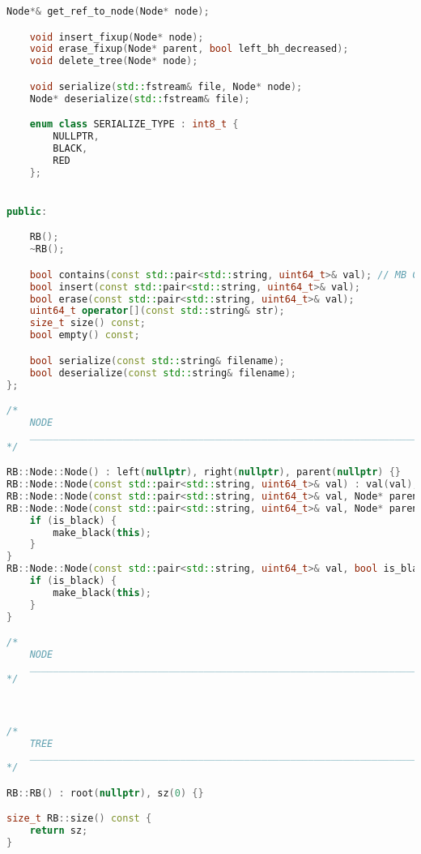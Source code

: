 \begin{lstlisting}[language=C++]
    Node*& get_ref_to_node(Node* node);

    void insert_fixup(Node* node);
    void erase_fixup(Node* parent, bool left_bh_decreased);
    void delete_tree(Node* node);

    void serialize(std::fstream& file, Node* node);
    Node* deserialize(std::fstream& file);

    enum class SERIALIZE_TYPE : int8_t {
        NULLPTR,
        BLACK,
        RED
    };


public:

    RB();
    ~RB();

    bool contains(const std::pair<std::string, uint64_t>& val); // MB CONST
    bool insert(const std::pair<std::string, uint64_t>& val);
    bool erase(const std::pair<std::string, uint64_t>& val);
    uint64_t operator[](const std::string& str);
    size_t size() const;
    bool empty() const;

    bool serialize(const std::string& filename);
    bool deserialize(const std::string& filename);
};

/*
    NODE
    ______________________________________________________________________________________________________________________________________
*/

RB::Node::Node() : left(nullptr), right(nullptr), parent(nullptr) {}
RB::Node::Node(const std::pair<std::string, uint64_t>& val) : val(val), left(nullptr), right(nullptr), parent(nullptr) {}
RB::Node::Node(const std::pair<std::string, uint64_t>& val, Node* parent) : val(val), left(nullptr), right(nullptr), parent(parent) {}
RB::Node::Node(const std::pair<std::string, uint64_t>& val, Node* parent, bool is_black) : val(val), left(nullptr), right(nullptr), parent(parent) {
    if (is_black) {
        make_black(this);
    }
}
RB::Node::Node(const std::pair<std::string, uint64_t>& val, bool is_black) : val(val), left(nullptr), right(nullptr), parent(nullptr) {
    if (is_black) {
        make_black(this);
    }
}

/*
    NODE
    ______________________________________________________________________________________________________________________________________
*/



/*
    TREE
    ______________________________________________________________________________________________________________________________________
*/

RB::RB() : root(nullptr), sz(0) {}

size_t RB::size() const {
    return sz;
}


\end{lstlisting}
